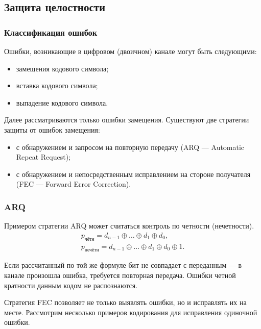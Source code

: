 \subsection{Защита целостности}


\begin{frame}
    \frametitle{Классификация ошибок}
    
    Ошибки, возникающие в цифровом (двоичном) канале могут быть следующими:
    \begin{itemize}
        \item замещения кодового символа;
        \item вставка кодового символа;
        \item выпадение кодового символа.
    \end{itemize}
    
    Далее рассматриваются только ошибки замещения. Существуют две стратегии защиты от ошибок замещения:
    \begin{itemize}
        \item с обнаружением и запросом на повторную передачу (ARQ --- Automatic Repeat Request);
        \item с обнаружением и непосредственным исправлением на стороне получателя (FEC --- Forward Error Correction).
    \end{itemize}
\end{frame}

\begin{frame}
    \frametitle{ARQ}
    
    Примером стратегии ARQ может считаться контроль по четности (нечетности). 
    \[
        \begin{split}
            p_{\text{чётн}}=d_{n-1}\oplus\ldots\oplus d_1\oplus d_0,\\
            p_{\text{нечётн}}=d_{n-1}\oplus\ldots\oplus d_1\oplus d_0\oplus 1.
        \end{split}
    \]
\end{frame}

Если рассчитанный по той же формуле бит не совпадает с переданным --- в канале произошла ошибка, требуется повторная передача. Ошибки четной кратности данным кодом не распознаются.

Стратегия FEC позволяет не только выявлять ошибки, но и исправлять их на месте. Рассмотрим несколько примеров кодирования для исправления одиночной ошибки.

